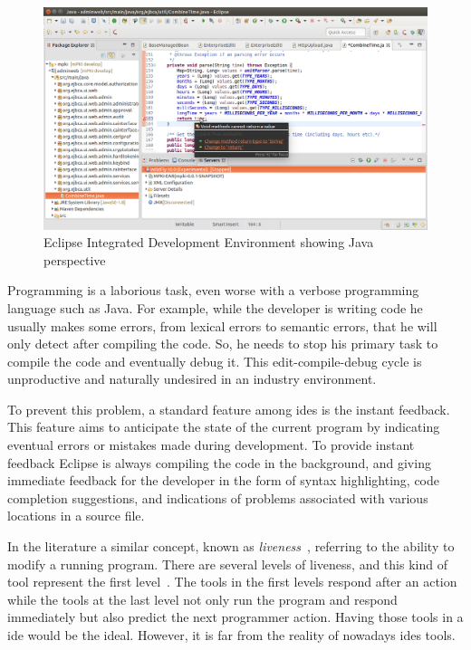 \begin{figure}[!htbp]
  \centering
  \includegraphics[width=1.0\textwidth]{images/eclipse-2}
    \caption{Eclipse Integrated Development Environment showing Java perspective}
  \label{fig:eclipse}
\end{figure} 

Programming is a laborious task, even worse with a verbose programming language such as Java. For example, while the developer is writing code he usually makes some errors, from lexical errors to semantic errors, that he will only detect after compiling the code. So, he needs to stop his primary task to compile the code and eventually debug it. This edit-compile-debug cycle is unproductive and naturally undesired in an industry environment. 

To prevent this problem, a standard feature among \glspl{ide} is the instant feedback. This feature aims to anticipate the state of the current program by indicating eventual errors or mistakes made during development. To provide instant feedback Eclipse is always compiling the code in the background, and giving immediate feedback for the developer in the form of syntax highlighting, code completion suggestions, and indications of problems associated with various locations in a source file. 

In the literature a similar concept, known as \textit{liveness}~\citep{alpern1985defining}, referring to the ability to modify a running program. There are several levels of liveness, and this kind of tool represent the first level~\citep{tanimoto2013perspective}. The tools in the first levels respond after an action while the tools at the last level not only run the program and respond immediately but also predict the next programmer action. Having those tools in a \gls{ide} would be the ideal. However, it is far from the reality of nowadays \glspl{ide} tools. 


